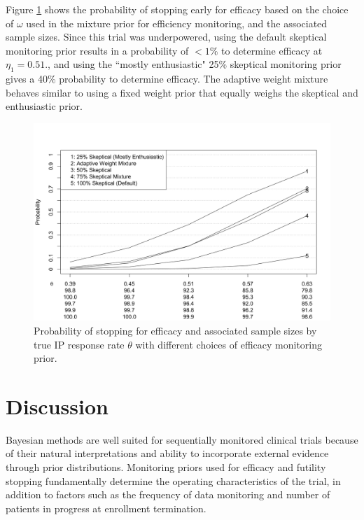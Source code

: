 \documentclass[useAMS,usenatbib,referee]{biom}
\begin{document}
Figure \ref{fig:ex2varyomega} shows the probability of stopping early for efficacy based on the choice of $\omega$ used in the mixture prior for efficiency monitoring, and the associated sample sizes. Since this trial was underpowered, using the default skeptical monitoring prior results in a probability of $<1\%$ to determine efficacy at $\eta_1=0.51$., and using the ``mostly enthusiastic" 25\% skeptical monitoring prior gives a 40\% probability to determine efficacy. The adaptive weight mixture behaves similar to using a fixed weight prior that equally weighs the skeptical and enthusiastic prior.

\begin{figure}\begin{center}
    \centering\includegraphics[width=6in]{figure6.png}
    \caption{Probability of stopping for efficacy and associated sample sizes by true IP response rate $\theta$ with different choices of efficacy monitoring prior.}
\label{fig:ex2varyomega}
 \end{center}
\end{figure}
\section{Discussion}
Bayesian methods are well suited for sequentially monitored clinical trials because of their natural interpretations and ability to incorporate external evidence through prior distributions. Monitoring priors used for efficacy and futility stopping fundamentally determine the operating characteristics of the trial, in addition to factors such as the frequency of data monitoring and number of patients in progress at enrollment termination. 
\end{document}
